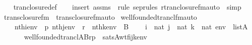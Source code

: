 \begin{isabellebody}
%
\isadelimproof
\ \ %
\endisadelimproof
%
\isatagproof
{}\isamarkupfalse%
\ tran{\isacharunderscore}{\kern0pt}closure{\isacharunderscore}{\kern0pt}def\isanewline
\ \ \isamarkupfalse%
\ {\isacharparenleft}{\kern0pt}insert\ assms\ {\isacharsemicolon}{\kern0pt}\ {\isacharparenleft}{\kern0pt}rule\ sep{\isacharunderscore}{\kern0pt}rules\ rtran{\isacharunderscore}{\kern0pt}closure{\isacharunderscore}{\kern0pt}fm{\isacharunderscore}{\kern0pt}auto\ {\isacharbar}{\kern0pt}\ simp{\isacharparenright}{\kern0pt}{\isacharparenright}{\kern0pt}{\isacharplus}{\kern0pt}%
\endisatagproof
{\isafoldproof}%
%
\isadelimproof
\isanewline
%
\endisadelimproof
%
\isadelimML
\isanewline
%
\endisadelimML
%
\isatagML
{}\isamarkupfalse%
\ {\isachardoublequoteopen}trans{\isacharunderscore}{\kern0pt}closure{\isacharunderscore}{\kern0pt}fm{\isachardoublequoteclose}\ \ trans{\isacharunderscore}{\kern0pt}closure{\isacharunderscore}{\kern0pt}fm{\isacharunderscore}{\kern0pt}auto%
\endisatagML
{\isafoldML}%
%
\isadelimML
\isanewline
%
\endisadelimML
\isanewline
{}\isamarkupfalse%
\ wellfounded{\isacharunderscore}{\kern0pt}trancl{\isacharunderscore}{\kern0pt}fm{\isacharunderscore}{\kern0pt}auto{\isacharcolon}{\kern0pt}\isanewline
\ \ \isanewline
\ \ \ \ {\isachardoublequoteopen}nth{\isacharparenleft}{\kern0pt}i{\isacharcomma}{\kern0pt}env{\isacharparenright}{\kern0pt}\ {\isacharequal}{\kern0pt}\ p{\isachardoublequoteclose}\ {\isachardoublequoteopen}nth{\isacharparenleft}{\kern0pt}j{\isacharcomma}{\kern0pt}env{\isacharparenright}{\kern0pt}\ {\isacharequal}{\kern0pt}\ r{\isachardoublequoteclose}\ \ {\isachardoublequoteopen}nth{\isacharparenleft}{\kern0pt}k{\isacharcomma}{\kern0pt}env{\isacharparenright}{\kern0pt}\ {\isacharequal}{\kern0pt}\ B{\isachardoublequoteclose}\isanewline
\ \ \ \ {\isachardoublequoteopen}i\ {\isasymin}\ nat{\isachardoublequoteclose}\ {\isachardoublequoteopen}j\ {\isasymin}\ nat{\isachardoublequoteclose}\ {\isachardoublequoteopen}k\ {\isasymin}\ nat{\isachardoublequoteclose}\ {\isachardoublequoteopen}env\ {\isasymin}\ list{\isacharparenleft}{\kern0pt}A{\isacharparenright}{\kern0pt}{\isachardoublequoteclose}\isanewline
\ \ \isanewline
\ \ \ \ {\isachardoublequoteopen}wellfounded{\isacharunderscore}{\kern0pt}trancl{\isacharparenleft}{\kern0pt}{\isacharhash}{\kern0pt}{\isacharhash}{\kern0pt}A{\isacharcomma}{\kern0pt}B{\isacharcomma}{\kern0pt}r{\isacharcomma}{\kern0pt}p{\isacharparenright}{\kern0pt}\ {\isasymlongleftrightarrow}\ sats{\isacharparenleft}{\kern0pt}A{\isacharcomma}{\kern0pt}{\isacharquery}{\kern0pt}wtf{\isacharparenleft}{\kern0pt}i{\isacharcomma}{\kern0pt}j{\isacharcomma}{\kern0pt}k{\isacharparenright}{\kern0pt}{\isacharcomma}{\kern0pt}env{\isacharparenright}{\kern0pt}{\isachardoublequoteclose}\isanewline

\end{isabellebody}
